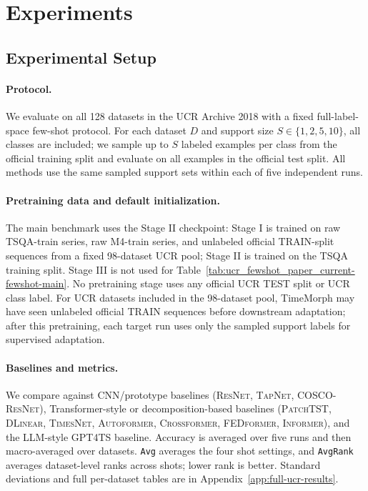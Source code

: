 \documentclass{article}
\begin{document}
\section{Experiments}
\label{sec:experiments}

\subsection{Experimental Setup}

\paragraph{Protocol.}
We evaluate on all 128 datasets in the UCR Archive 2018 with a fixed full-label-space few-shot protocol. For each dataset $D$ and support size $S\in\{1,2,5,10\}$, all classes are included; we sample up to $S$ labeled examples per class from the official training split and evaluate on all examples in the official test split. All methods use the same sampled support sets within each of five independent runs.

\paragraph{Pretraining data and default initialization.}
The main benchmark uses the Stage II checkpoint: Stage I is trained on raw TSQA-train series, raw M4-train series, and unlabeled official TRAIN-split sequences from a fixed 98-dataset UCR pool; Stage II is trained on the TSQA training split. Stage III is not used for Table~\ref{tab:ucr_fewshot_paper_current-fewshot-main}. No pretraining stage uses any official UCR TEST split or UCR class label. For UCR datasets included in the 98-dataset pool, TimeMorph may have seen unlabeled official TRAIN sequences before downstream adaptation; after this pretraining, each target run uses only the sampled support labels for supervised adaptation.


\paragraph{Baselines and metrics.}
We compare against CNN/prototype baselines (\textsc{ResNet}, \textsc{TapNet}, \textsc{COSCO-ResNet}), Transformer-style or decomposition-based baselines (\textsc{PatchTST}, \textsc{DLinear}, \textsc{TimesNet}, \textsc{Autoformer}, \textsc{Crossformer}, \textsc{FEDformer}, \textsc{Informer}), and the LLM-style \textsc{GPT4TS} baseline. Accuracy is averaged over five runs and then macro-averaged over datasets. \texttt{Avg} averages the four shot settings, and \texttt{AvgRank} averages dataset-level ranks across shots; lower rank is better. Standard deviations and full per-dataset tables are in Appendix~\ref{app:full-ucr-results}.
\end{document}
